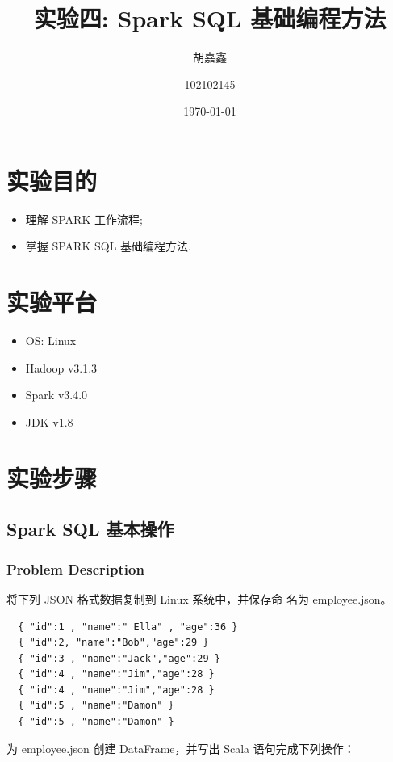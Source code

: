 \documentclass{article}
\title{实验四: Spark SQL 基础编程方法}
\author{胡嘉鑫 \and 102102145}
\date{\today}
\begin{document}
\maketitle
\tableofcontents

\section{实验目的}
\begin{itemize}
  \item 理解 SPARK 工作流程;
  \item 掌握 SPARK SQL 基础编程方法.
\end{itemize}

\section{实验平台}
\begin{itemize}
  \item OS: Linux
  \item Hadoop v3.1.3
  \item Spark v3.4.0
  \item JDK v1.8
\end{itemize}

\section{实验步骤}

\subsection{Spark SQL 基本操作}
\subsubsection{Problem Description}
将下列 JSON 格式数据复制到 Linux 系统中，并保存命
名为 employee.json。
\begin{center}
\begin{verbatim}
  { "id":1 , "name":" Ella" , "age":36 }
  { "id":2, "name":"Bob","age":29 }
  { "id":3 , "name":"Jack","age":29 }
  { "id":4 , "name":"Jim","age":28 }
  { "id":4 , "name":"Jim","age":28 }
  { "id":5 , "name":"Damon" }
  { "id":5 , "name":"Damon" }
\end{verbatim}
\end{center}
为 employee.json 创建 DataFrame，并写出 Scala 语句完成下列操作：
\end{document}
